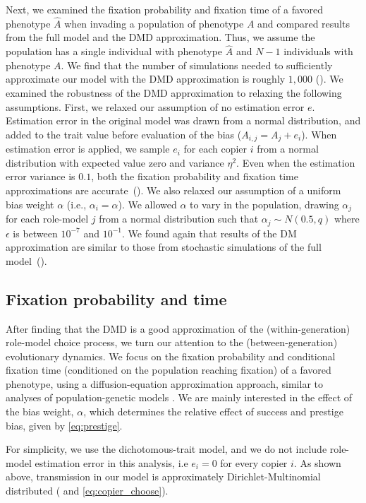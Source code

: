\documentclass[12pt]{extarticle}
\begin{document}
Next, we examined the fixation probability and fixation time of a favored phenotype $\hat{A}$ when invading a population of phenotype $A$ and compared results from the full model and the DMD approximation.
Thus, we assume the population has a single individual with phenotype $\hat{A}$ and $N-1$ individuals with phenotype $A$. 
We find that the number of simulations needed to sufficiently approximate our model with the DMD approximation is roughly $1,000$ ().
We examined the robustness of the DMD approximation to relaxing the following assumptions.
First, we relaxed our assumption of no estimation error $e$.
Estimation error in the original model was drawn from a normal distribution, and added to the trait value before evaluation of the bias ($A_{i,j} = A_j + e_i$).
When estimation error is applied, we sample $e_i$ for each copier $i$ from a normal distribution with expected value zero and variance $\eta^2$.
Even when the estimation error variance is $0.1$, both the fixation probability and fixation time approximations are accurate~(). 
We also relaxed our assumption of a uniform bias weight $\alpha$ (i.e., $\alpha_i=\alpha$). We allowed $\alpha$ to vary in the population, drawing $\alpha_j$ for each role-model $j$ from a normal distribution such that $\alpha_j \sim N(0.5,q)$ where $\epsilon$ is between $10^{-7}$ and $10^{-1}$. 
We found again that results of the DM approximation are similar to those from stochastic simulations of the full model~().


\subsection*{Fixation probability and time}
After finding that the DMD is a good approximation of the (within-generation) role-model choice process, we turn our attention to the (between-generation) evolutionary dynamics.
We focus on the fixation probability and conditional fixation time (conditioned on the population reaching fixation) of a favored phenotype, using a diffusion-equation approximation approach, similar to analyses of population-genetic models \citep{kimura,kimura_average,otto_fixation}.
We are mainly interested in the effect of the bias weight, $\alpha$, which determines the relative effect of success and prestige bias, given by \cref{eq:prestige}.

For simplicity, we use the dichotomous-trait model, and we do not include role-model estimation error in this analysis, i.e $e_i=0$ for every copier $i$.
As shown above, transmission in our model is approximately Dirichlet-Multinomial distributed ( and \cref{eq:copier_choose}).
\end{document}
